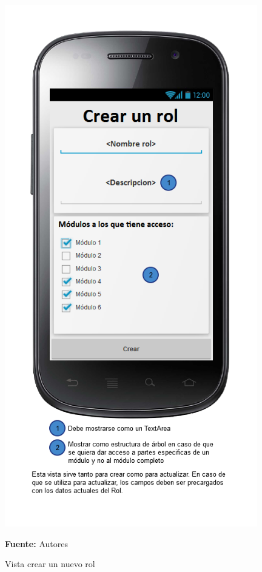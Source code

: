 \begin{figure}[!htb]
  \begin{center}
\includegraphics[width=11cm]{./imagenes/UI/Administracion/crear_un_nuevo_rol.png}
    \caption{Vista crear un nuevo rol}
    \label{fig:Vista_crear_un_nuevo_rol}
    \textbf{Fuente:}  Autores
  \end{center}
\end{figure}
